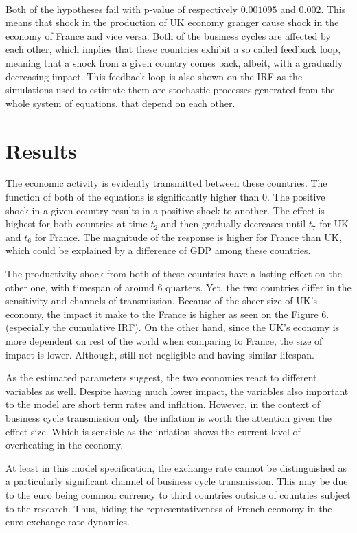 \documentclass{article}
\begin{document}
\

Both of the hypotheses fail with p-value of respectively $0.001095$ and $0.002$. This means that shock in the production of UK economy granger cause shock in the economy of France and vice versa. Both of the business cycles are affected by each other, which implies that these countries exhibit a so called feedback loop, meaning that a shock from a given country comes back, albeit, with a gradually decreasing impact. This feedback loop is also shown on the IRF as the simulations used to estimate them are stochastic processes generated from the whole system of equations, that depend on each other.

\section*{Results}

The economic activity is evidently transmitted between these countries. The function of both of the equations is significantly higher than 0. The positive shock in a given country results in a positive shock to another. The effect is highest for both countries at time $t_2$ and then gradually decreases until $t_7$ for UK and $t_6$ for France. The magnitude of the response is higher for France than UK, which could be explained by a difference of GDP among these countries.

The productivity shock from both of these countries have a lasting effect on the other one, with timespan of around 6 quarters. Yet, the two countries differ in the sensitivity and channels of transmission. Because of the sheer size of UK's economy, the impact it make to the France is higher as seen on the Figure 6. (especially the cumulative IRF). On the other hand, since the UK's economy is more dependent on rest of the world when comparing to France, the size of impact is lower. Although, still not negligible and having similar lifespan. 

As the estimated parameters suggest, the two economies react to different variables as well. Despite having much lower impact, the variables also important to the model are short term rates and inflation. However, in the context of business cycle transmission only the inflation is  worth the attention given the effect size. Which is sensible as the inflation shows the current level of overheating in the economy.

At least in this model specification, the exchange rate cannot be distinguished as a particularly significant channel of business cycle transmission. This may be due to the euro being common currency to third countries outside of countries subject to the research. Thus, hiding the representativeness of French economy in the euro exchange rate dynamics. 
\end{document}
